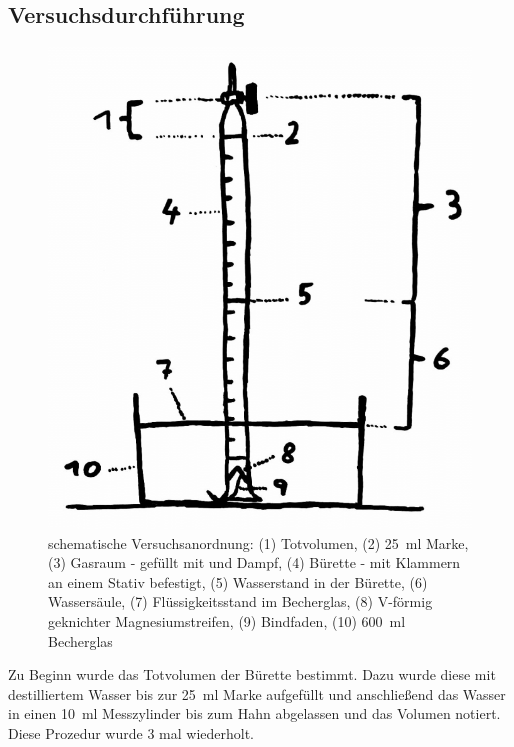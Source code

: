 \documentclass{article}
\begin{document}
    \pagebreak
    
    \subsection{Versuchsdurchführung} \label{sec:Versuch}
    
    \begin{figure}[h]
      \includegraphics[scale=0.3, center]{Graphiken/Versuchsanordnungen/VersuchsanordnungMagnesium.png} 
      \caption[schematische Versuchsanordnung, Quelle: Autor]{schematische Versuchsanordnung: (1) Totvolumen, (2) \SI[mode=text]{25}{\milli\litre} Marke, (3) Gasraum - gefüllt mit  und  Dampf, (4) Bürette - mit Klammern an einem Stativ befestigt, (5) Wasserstand in der Bürette, (6) Wassersäule, (7) Flüssigkeitsstand im Becherglas, (8) V-förmig geknichter Magnesiumstreifen, (9) Bindfaden, (10) \SI[mode=text]{600}{\milli\litre} Becherglas}
      \label{fig:Versuchsanordnung}
    \end{figure}
    
    Zu Beginn wurde das Totvolumen der Bürette bestimmt. Dazu wurde diese mit destilliertem Wasser bis zur \SI[mode=text]{25}{\milli\litre} Marke aufgefüllt und anschließend das Wasser in einen \SI[mode=text]{10}{\milli\litre} Messzylinder bis zum Hahn abgelassen und das Volumen notiert. Diese Prozedur wurde 3 mal wiederholt.\\
    
\end{document}
